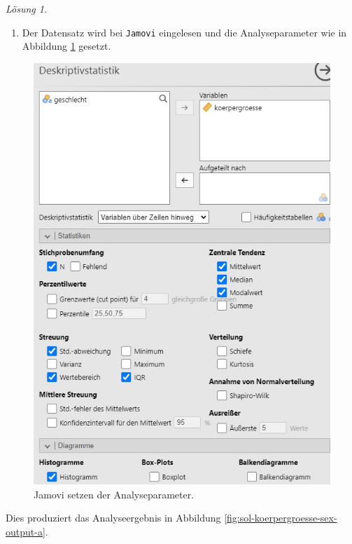\documentclass[
]{book}
\providecommand{\tightlist}{%
  \setlength{\itemsep}{0pt}\setlength{\parskip}{0pt}}
\theoremstyle{definition}
\theoremstyle{definition}
\theoremstyle{definition}
\theoremstyle{definition}
\theoremstyle{remark}
\newtheorem*{solution}{Lösung}
\begin{document}
\begin{solution}
\leavevmode

\begin{enumerate}
\def\labelenumi{(\alph{enumi})}
\tightlist
\item
  Der Datensatz wird bei \texttt{Jamovi} eingelesen und die Analyseparameter wie in Abbildung \ref{fig:sol-koerpergroesse-sex-input-a} gesetzt.
\end{enumerate}

\begin{figure}
\includegraphics[width=1\linewidth]{figures/02-exr-koerpergroesse-sex-jmv-input-a} \caption{Jamovi setzen der Analyseparameter.}\label{fig:sol-koerpergroesse-sex-input-a}
\end{figure}

Dies produziert das Analyseergebnis in Abbildung \ref{fig:sol-koerpergroesse-sex-output-a}.


\end{solution}
\end{document}
